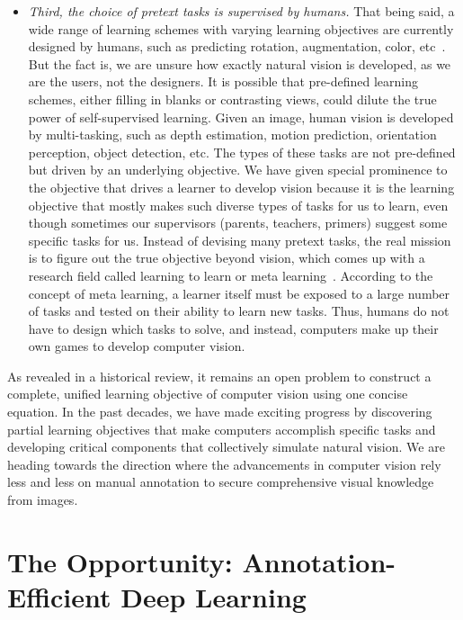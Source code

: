 \begin{itemize}
    \item \textit{Third, the choice of pretext tasks is supervised by humans.} That being said, a wide range of learning schemes with varying learning objectives are currently designed by humans, such as predicting rotation, augmentation, color, etc~\citep{jing2020self}. But the fact is, we are unsure how exactly natural vision is developed, as we are the users, not the designers. It is possible that pre-defined learning schemes, either filling in blanks or contrasting views, could dilute the true power of self-supervised learning. Given an image, human vision is developed by multi-tasking, such as depth estimation, motion prediction, orientation perception, object detection, etc. The types of these tasks are not pre-defined but driven by an underlying objective. We have given special prominence to the objective that drives a learner to develop vision because it is the learning objective that mostly makes such diverse types of tasks for us to learn, even though sometimes our supervisors (parents, teachers, primers) suggest some specific tasks for us. Instead of devising many pretext tasks, the real mission is to figure out the true objective beyond vision, which comes up with a research field called learning to learn or meta learning~\citep{lake2015human}. According to the concept of meta learning, a learner itself must be exposed to a large number of tasks and tested on their ability to learn new tasks. Thus, humans do not have to design which tasks to solve, and instead, computers make up their own games to develop computer vision.
\end{itemize}


As revealed in a historical review, it remains an open problem to construct a complete, unified learning objective of computer vision using one concise equation. In the past decades, we have made exciting progress by discovering partial learning objectives that make computers accomplish specific tasks and developing critical components that collectively simulate natural vision. We are heading towards the direction where the advancements in computer vision rely less and less on manual annotation to secure comprehensive visual knowledge from images. 


\section{The Opportunity: Annotation-Efficient Deep Learning}
\label{ch2:challenge_opportunity:opportunity}


